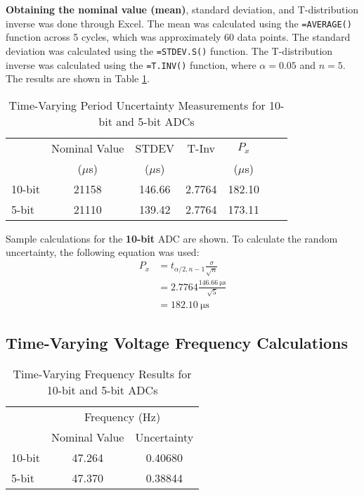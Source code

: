 \noindent \textbf{Obtaining the nominal value (mean)}, standard deviation, and T-distribution inverse was done through Excel. The mean was calculated using the \texttt{=AVERAGE()} function 
across 5 cycles, which was approximately 60 data points. The standard deviation was calculated using the \texttt{=STDEV.S()} function. 
The T-distribution inverse was calculated using the \texttt{=T.INV()} function, where $\alpha = 0.05$ and $n = 5$. The results are shown in Table 
\ref{tab:time-varying-period-uncertainty-measurements}.

\begin{table}[h]
   \centering
   \caption{Time-Varying Period Uncertainty Measurements for 10-bit and 5-bit ADCs}
   \label{tab:time-varying-period-uncertainty-measurements}
   \begin{tabular}{lcccccc}
      \toprule
      & Nominal Value & STDEV & T-Inv & $P_x$ \\
      & ($\mu$s)      & ($\mu$s)           &                        & ($\mu$s)    \\
      \midrule
      10-bit & 21158 & 146.66 & 2.7764 & 182.10 \\
      5-bit  & 21110 & 139.42 & 2.7764 & 173.11 \\
      \bottomrule
   \end{tabular}
\end{table}

Sample calculations for the \textbf{10-bit} ADC are shown. To calculate the random uncertainty, the following equation was used:
\[
\begin{aligned}
   P_x &= t_{\alpha/2, n-1} \frac{\sigma}{\sqrt{n}} \\
         &= 2.7764 \frac{\qty{146.66}{\micro\second}}{\sqrt{5}} \\
         &= \boxed{\qty{182.10}{\micro\second}}
\end{aligned}
\]

\subsection{Time-Varying Voltage Frequency Calculations}
\begin{table}[h]
   \centering
   \caption{Time-Varying Frequency Results for 10-bit and 5-bit ADCs}
   \label{tab:time-varying-frequency-measurements}
   \begin{tabular}{lcc}
   \toprule
      & \multicolumn{2}{c}{Frequency (Hz)}    \\
   \cmidrule{2-3}
   & Nominal Value & Uncertainty \\
   \midrule
   10-bit & 47.264 & 0.40680 \\
   5-bit  & 47.370 & 0.38844 \\
   \bottomrule
   \end{tabular}
\end{table}

